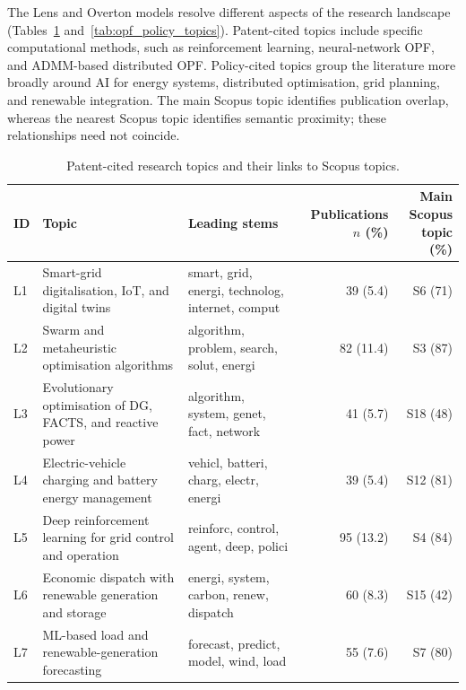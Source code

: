 \documentclass[a4paper,fleqn]{cas-sc}
\begin{document}
The Lens and Overton models resolve different aspects of the research landscape (Tables~\ref{tab:opf_cited_topics} and~\ref{tab:opf_policy_topics}). Patent-cited topics include specific computational methods, such as reinforcement learning, neural-network OPF, and ADMM-based distributed OPF. Policy-cited topics group the literature more broadly around AI for energy systems, distributed optimisation, grid planning, and renewable integration. The main Scopus topic identifies publication overlap, whereas the nearest Scopus topic identifies semantic proximity; these relationships need not coincide.

\begin{table}[p]
\centering
\caption{Patent-cited research topics and their links to Scopus topics.}
\label{tab:opf_cited_topics}
\scriptsize
\setlength{\tabcolsep}{3pt}
\renewcommand{\arraystretch}{1.10}
\begin{tabularx}{\textwidth}{
l
>{\raggedright\arraybackslash}X
>{\raggedright\arraybackslash}X
rr}
\toprule
ID & Topic & Leading stems
& \shortstack{Publications\\$n$ (\%)}
& \shortstack{Main Scopus\\topic (\%)} \\
\midrule

L1 & Smart-grid digitalisation, IoT, and digital twins
& smart, grid, energi, technolog, internet, comput
& 39 (5.4) & S6 (71) \\

L2 & Swarm and metaheuristic optimisation algorithms
& algorithm, problem, search, solut, energi
& 82 (11.4) & S3 (87) \\

L3 & Evolutionary optimisation of DG, FACTS, and reactive power
& algorithm, system, genet, fact, network
& 41 (5.7) & S18 (48) \\

L4 & Electric-vehicle charging and battery energy management
& vehicl, batteri, charg, electr, energi
& 39 (5.4) & S12 (81) \\

L5 & Deep reinforcement learning for grid control and operation
& reinforc, control, agent, deep, polici
& 95 (13.2) & S4 (84) \\

L6 & Economic dispatch with renewable generation and storage
& energi, system, carbon, renew, dispatch
& 60 (8.3) & S15 (42) \\

L7 & ML-based load and renewable-generation forecasting
& forecast, predict, model, wind, load
& 55 (7.6) & S7 (80) \\


\end{tabularx}
\end{table}
\end{document}
